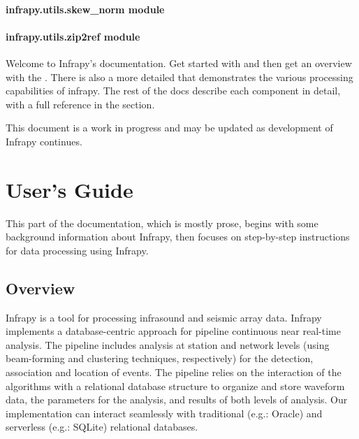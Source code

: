 \documentclass[letterpaper,10pt,english]{sphinxmanual}
\begin{document}
\subsubsection{infrapy.utils.skew\_norm module}
\label{\detokenize{infrapy.utils:infrapy-utils-skew-norm-module}}

\subsubsection{infrapy.utils.zip2ref module}
\label{\detokenize{infrapy.utils:infrapy-utils-zip2ref-module}}
Welcome to Infrapy’s documentation.  Get started with {\hyperref[\detokenize{installation:installation}]{}} and then get an overview with the {\hyperref[\detokenize{quickstart:quickstart}]{}}.  There is also a more detailed {\hyperref[\detokenize{tutorial:tutorial}]{}} that demonstrates the various processing capabilities of infrapy.  The rest of the docs describe each component in detail, with a full reference in the {\hyperref[\detokenize{infrapy:api}]{}} section.

This document is a work in progress and may be updated as development of Infrapy continues.

\noindent{}


\chapter{User’s Guide}
\label{\detokenize{index:user-s-guide}}
This part of the documentation, which is mostly prose, begins with some background information about Infrapy, then focuses on step-by-step instructions for data processing using Infrapy.


\section{Overview}
\label{\detokenize{index:overview}}
Infrapy is a tool for processing infrasound and seismic array data. Infrapy implements a database-centric
approach for pipeline continuous near real-time analysis. The pipeline includes analysis at station and network levels (using beam-forming and clustering techniques, respectively) for the
detection, association and location of events.  The pipeline relies on the interaction of the algorithms with a relational database structure to organize and store waveform data, the
parameters for the analysis, and results of both levels of analysis. Our implementation can interact seamlessly with traditional (e.g.: Oracle) and serverless (e.g.: SQLite) relational databases.



\renewcommand{\indexname}{Index}
\printindex
\end{document}
